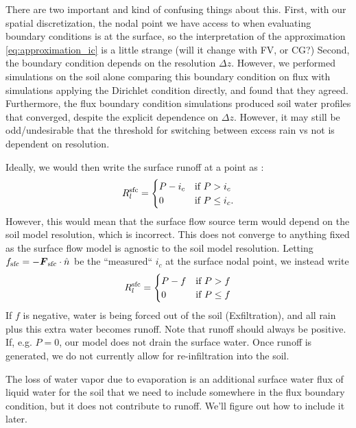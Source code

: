 \documentclass[twoside,10pt]{report}
\begin{document}
There are two important and kind of confusing things about this. First,  with our spatial discretization, the nodal point we have access to when evaluating boundary conditions is at the surface, so the interpretation of the approximation \eqref{eq:approximation_ic} is a little strange (will it change with FV, or CG?) Second, the boundary condition depends on the resolution $\Delta z$. However, we performed simulations on the soil alone comparing this boundary condition on flux with simulations applying the Dirichlet condition directly, and found that they agreed. Furthermore, the flux boundary condition simulations produced soil water profiles that converged, despite the explicit dependence on $\Delta z$. However, it may still be odd/undesirable that the threshold for switching between excess rain vs not is dependent on resolution.

Ideally, we would then write the surface runoff at a point as \citep{Entekhabi89}:
 \begin{equation}
    R_l^{\rm sfc} = 
    \begin{cases}
        P-i_c & \text{if } P >i_c \\
        0      & \text{if } P \leq i_c.
    \end{cases}
\end{equation}
However, this would mean that the surface flow source term would depend on the soil model resolution, which is incorrect. This does not converge to anything fixed as the surface flow model is agnostic to the soil model resolution. Letting $f_{\rm sfc} = -\vec{F}_{\rm sfc} \cdot \hat{n}$ be the ``measured`` $i_c$ at the surface nodal point, we instead write
 \begin{equation}
    R_l^{\rm sfc} = 
        \begin{cases}
        P-f & \text{if } P >f \\
        0      & \text{if } P \leq f
    \end{cases}
\end{equation}
If $f$ is negative, water is being forced out of the soil (Exfiltration), and all rain plus this extra water becomes runoff. Note that runoff should always be positive. If, e.g. $P = 0$, our model does not drain the surface water. Once runoff is generated, we do not currently allow for re-infiltration into the soil. 

The loss of water vapor due to evaporation is an additional surface water flux of liquid water for the soil that we need to include somewhere in the flux boundary condition, but it does not contribute to runoff. We'll figure out how to include it later.
\end{document}
